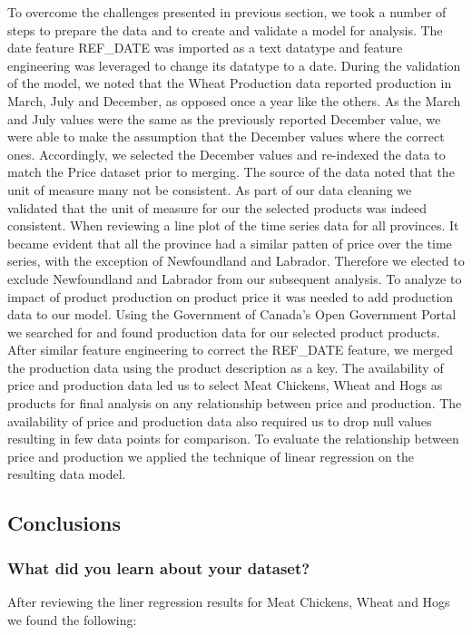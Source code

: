 To overcome the challenges presented in previous section, we took a number of steps to prepare the data and to create and validate a model for analysis.  
The date feature REF\_DATE was imported as a text datatype and feature engineering was leveraged to change its datatype to a date.
During the validation of the model, we noted that the Wheat Production data reported production in March, July and December, as opposed once a year like the others.
As the March and July values were the same as the previously reported December value, we were able to make the assumption that the December values where the correct ones.
Accordingly, we selected the December values and re-indexed the data to match the Price dataset prior to merging.
The source of the data noted that the unit of measure many not be consistent. As part of our data cleaning we validated that the unit of measure for our the selected products was indeed consistent.
When reviewing a line plot of the time series data for all provinces.
It became evident that all the province had a similar patten of price over the time series, with the exception of Newfoundland and Labrador.
Therefore we elected to exclude Newfoundland and Labrador from our subsequent analysis.
To analyze to impact of product production on product price it was needed to add production data to our model.
Using the Government of Canada's Open Government Portal we searched for and found production data for our selected product products.
After similar feature engineering to correct the REF\_DATE feature, we merged the production data using the product description as a key.
The availability of price and production data led us to select Meat Chickens, Wheat and Hogs as products for final analysis on any relationship between price and production.
The availability of price and production data also required us to drop null values resulting in few data points for comparison.
To evaluate the relationship between price and production we applied the technique of linear regression on the resulting data model.

\subsection{Conclusions}

\subsubsection{What did you learn about your dataset?}

After reviewing the liner regression results for Meat Chickens, Wheat and Hogs we found the following:

